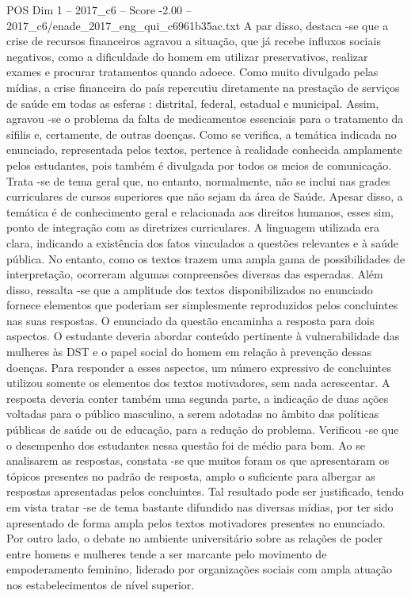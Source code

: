 \begin{textsample}{POS Dim 1 – 2017\_c6 – Score -2.00 – 2017\_c6/enade\_2017\_eng\_qui\_c6961b35ac.txt}
A par disso, destaca -se que a crise de recursos financeiros agravou a situação, que já recebe influxos sociais negativos, como a dificuldade do homem em utilizar preservativos, realizar exames e procurar tratamentos quando adoece.
Como muito divulgado pelas mídias, a crise financeira do país repercutiu diretamente na prestação de serviços de saúde em todas as esferas : distrital, federal, estadual e municipal.
Assim, agravou -se o problema da falta de medicamentos essenciais para o tratamento da sífilis e, certamente, de outras doenças.
Como se verifica, a temática indicada no enunciado, representada pelos textos, pertence à realidade conhecida amplamente pelos estudantes, pois também é divulgada por todos os meios de comunicação.
Trata -se de tema geral que, no entanto, normalmente, não se inclui nas grades curriculares de cursos superiores que não sejam da área de Saúde.
Apesar disso, a temática é de conhecimento geral e relacionada aos direitos humanos, esses sim, ponto de integração com as diretrizes curriculares.
A linguagem utilizada era clara, indicando a existência dos fatos vinculados a questões relevantes e à saúde pública.
No entanto, como os textos trazem uma ampla gama de possibilidades de interpretação, ocorreram algumas compreensões diversas das esperadas.
Além disso, ressalta -se que a amplitude dos textos disponibilizados no enunciado fornece elementos que poderiam ser simplesmente reproduzidos pelos concluintes nas suas respostas.
O enunciado da questão encaminha a resposta para dois aspectos.
O estudante deveria abordar conteúdo pertinente à vulnerabilidade das mulheres às DST e o papel social do homem em relação à prevenção dessas doenças.
Para responder a esses aspectos, um número expressivo de concluintes utilizou somente os elementos dos textos motivadores, sem nada acrescentar.
A resposta deveria conter também uma segunda parte, a indicação de duas ações voltadas para o público masculino, a serem adotadas no âmbito das políticas públicas de saúde ou de educação, para a redução do problema.
Verificou -se que o desempenho dos estudantes nessa questão foi de médio para bom.
Ao se analisarem as respostas, constata -se que muitos foram os que apresentaram os tópicos presentes no padrão de resposta, amplo o suficiente para albergar as respostas apresentadas pelos concluintes.
Tal resultado pode ser justificado, tendo em vista tratar -se de tema bastante difundido nas diversas mídias, por ter sido apresentado de forma ampla pelos textos motivadores presentes no enunciado.
Por outro lado, o debate no ambiente universitário sobre as relações de poder entre homens e mulheres tende a ser marcante pelo movimento de empoderamento feminino, liderado por organizações sociais com ampla atuação nos estabelecimentos de nível superior.

\end{textsample}
